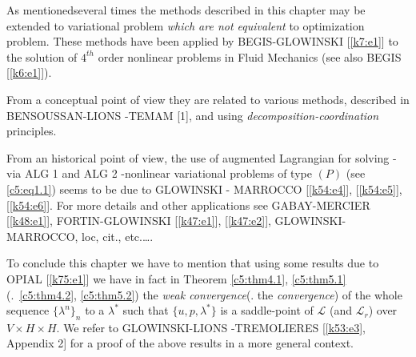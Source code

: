  As mentioned\pageoriginale   several times the methods described in
 this chapter may  
 be extended to variational problem \textit{which are not equivalent} 
 to optimization problem. These methods have been applied by 
 BEGIS-GLOWI\-NSKI [\ref{k7:e1}] to the solution  of $4^{th}$ order nonlinear  
 problems in Fluid Mechanics (see also BEGIS [\ref{k6:e1}]).      
 
 From a conceptual point of view they are related to various methods, 
 described in BENSOUSSAN-LIONS -TEMAM [1],  and using 
 \textit{decom\-position-coordination} principles.   
 
 From an historical point of view,  the use of augmented Lagrangian 
 for solving -via ALG 1 and ALG 2  -nonlinear variational problems of 
 type $(P)$ (see \eqref{c5:eq1.1}) seems to be due to GLOWINSKI - 
 MARROCCO [\ref{k54:e4}], [\ref{k54:e5}],  [\ref{k54:e6}].  For more
 details and other applications see  
 GABAY-MERCIER [\ref{k48:e1}],  FORTIN-GLOWINSKI [\ref{k47:e1}],
 [\ref{k47:e2}],  GLOWINSKI-MARR\-OCCO, 
 loc, cit.,  etc.\ldots.       
 
 To conclude this chapter we have to mention that using some results 
 due to OPIAL [\ref{k75:e1}] we have in fact in Theorem \ref{c5:thm4.1}, 
 \ref{c5:thm5.1} (\resp.~\ref{c5:thm4.2},  \ref{c5:thm5.2}) the 
 \textit{weak  convergence}(\resp.  the \textit{convergence})  
 of the whole sequence $\{ \lambda^n \}_n$ to a $\lambda^*$ such that 
 $\{ u, p, \lambda^* \}$ is a saddle-point of $\mathscr{L}$ (and 
 $\mathscr{L}_r$) over $V \times  H\times H$. We refer to 
 GLOWINSKI-LIONS -TREMOLIERES [\ref{k53:e3},  Appendix 2] for a proof
 of the above results in a more general context.         
